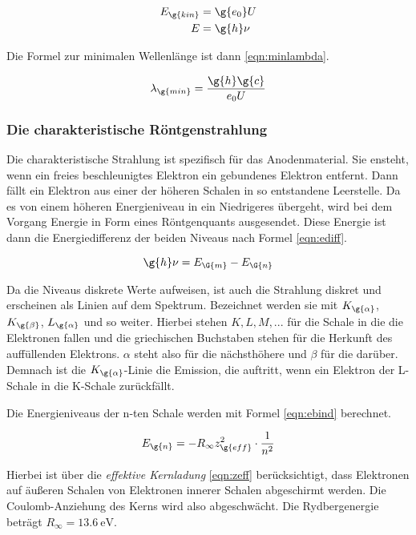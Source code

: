 \begin{align}
  E_{\g{kin}} &= \g{e_0} U \label{eqn:Ekin}\\
  E &= \g{h} \nu \label{eqn:Estrahl}
\end{align}

Die Formel zur minimalen Wellenlänge ist dann \eqref{eqn:minlambda}.

\begin{equation}
  \lambda_{\g{min}} = \frac{\g{h} \g{c}}{e_0 U}
  \label{eqn:minlambda}
\end{equation}

\subsubsection{Die charakteristische Röntgenstrahlung}

Die charakteristische Strahlung ist spezifisch für das Anodenmaterial. Sie ensteht,
wenn ein freies beschleunigtes Elektron ein gebundenes Elektron entfernt. Dann
fällt ein Elektron aus einer der höheren Schalen in so entstandene Leerstelle.
Da es von einem höheren Energieniveau in ein Niedrigeres übergeht, wird bei dem Vorgang Energie
in Form eines Röntgenquants ausgesendet. Diese Energie ist dann die Energiedifferenz der
beiden Niveaus nach Formel \eqref{eqn:ediff}.

\begin{equation}
  \g{h} \nu = E_{\G{m}}-E_{\G{n}}
  \label{eqn:ediff}
\end{equation}

Da die Niveaus diskrete Werte aufweisen, ist auch die Strahlung diskret und erscheinen
als Linien auf dem Spektrum. Bezeichnet werden sie mit $K_{\g{\alpha}}$, $K_{\g{\beta}}$,
$L_{\g{\alpha}}$ und so weiter.
Hierbei stehen $K, L, M, ...$ für die Schale in die die Elektronen fallen und
die griechischen Buchstaben stehen für die Herkunft des auffüllenden Elektrons.
$\alpha$ steht also für die nächsthöhere und $\beta$ für die darüber.
Demnach ist die $K_{\g{\alpha}}$-Linie die Emission, die auftritt, wenn ein Elektron
der L-Schale in die K-Schale zurückfällt.

Die Energieniveaus der n-ten Schale werden mit Formel \eqref{eqn:ebind} berechnet.

\begin{equation}
  E_{\g{n}} = -R_{\infty} z_{\g{eff}}^2 \cdot \frac{1}{n^2}
  \label{eqn:ebind}
\end{equation}

Hierbei ist über die \emph{effektive Kernladung} \eqref{eqn:zeff} berücksichtigt, dass
Elektronen auf äußeren Schalen von Elektronen innerer Schalen abgeschirmt werden.
Die Coulomb-Anziehung des Kerns wird also abgeschwächt. Die Rydbergenergie beträgt
$R_{\infty} = \SI{13.6}{\electronvolt}$.

